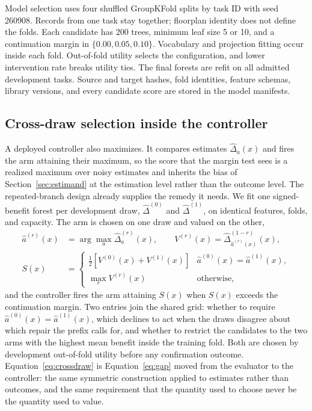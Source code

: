 \documentclass{article}
\begin{document}
Model selection uses four shuffled GroupKFold splits by task ID with seed 260908. Records from one task stay together; floorplan identity does not define the folds. Each candidate has 200 trees, minimum leaf size 5 or 10, and a continuation margin in $\{0.00,0.05,0.10\}$. Vocabulary and projection fitting occur inside each fold. Out-of-fold utility selects the configuration, and lower intervention rate breaks utility ties. The final forests are refit on all admitted development tasks. Source and target hashes, fold identities, feature schemas, library versions, and every candidate score are stored in the model manifests.

\subsection{Cross-draw selection inside the controller}
\label{sec:crossdraw}

A deployed controller also maximizes. It compares estimates $\widehat\Delta_a(x)$ and fires the arm attaining their maximum, so the score that the margin test sees is a realized maximum over noisy estimates and inherits the bias of Section~\ref{sec:estimand} at the estimation level rather than the outcome level. The repeated-branch design already supplies the remedy it needs. We fit one signed-benefit forest per development draw, $\widehat\Delta^{(0)}$ and $\widehat\Delta^{(1)}$, on identical features, folds, and capacity. The arm is chosen on one draw and valued on the other,
\begin{equation}
\begin{aligned}
\widehat a^{(r)}(x)&=\arg\max_a\widehat\Delta^{(r)}_a(x),
\qquad V^{(r)}(x)=\widehat\Delta^{(1-r)}_{\widehat a^{(r)}(x)}(x),
\\
S(x)&=\begin{cases}\tfrac12\left[V^{(0)}(x)+V^{(1)}(x)\right] & \widehat a^{(0)}(x)=\widehat a^{(1)}(x),\\[2pt] \max_r V^{(r)}(x) & \text{otherwise,}\end{cases}
\end{aligned}
\label{eq:crossdraw}
\end{equation}
and the controller fires the arm attaining $S(x)$ when $S(x)$ exceeds the continuation margin. Two entries join the shared grid: whether to require $\widehat a^{(0)}(x)=\widehat a^{(1)}(x)$, which declines to act when the draws disagree about which repair the prefix calls for, and whether to restrict the candidates to the two arms with the highest mean benefit inside the training fold. Both are chosen by development out-of-fold utility before any confirmation outcome. Equation~\ref{eq:crossdraw} is Equation~\ref{eq:gap} moved from the evaluator to the controller: the same symmetric construction applied to estimates rather than outcomes, and the same requirement that the quantity used to choose never be the quantity used to value.
\end{document}
